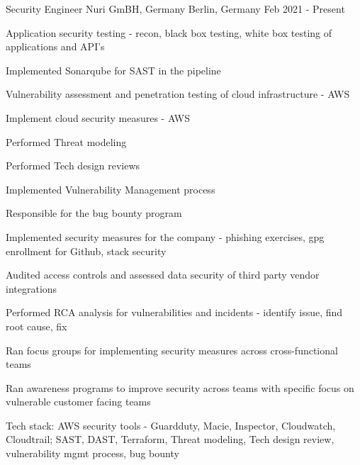 
\begin{cventries}

\cventry
    {Security Engineer} %
    {Nuri GmBH, Germany} %
    {Berlin, Germany} %
    {Feb 2021 - Present} %
    {
      \begin{cvitems} %
        \item {Application security testing - recon, black box testing, white box testing of applications and API's}
        \item {Implemented Sonarqube for SAST in the pipeline}
        \item {Vulnerability assessment and penetration testing of cloud infrastructure - AWS}
        \item {Implement cloud security measures - AWS}
        \item {Performed Threat modeling}
        \item {Performed Tech design reviews}
        \item {Implemented Vulnerability Management process}
        \item {Responsible for the bug bounty program}
        \item {Implemented security measures for the company - phishing exercises, gpg enrollment for Github, stack security}
        \item {Audited access controls and assessed data security of third party vendor integrations}
        \item {Performed RCA analysis for vulnerabilities and incidents - identify issue, find root cause, fix}
        \item {Ran focus groups for implementing security measures across cross-functional teams}
        \item {Ran awareness programs to improve security across teams with specific focus on vulnerable customer facing teams}
        \item {Tech stack: AWS security tools - Guardduty, Macie, Inspector, Cloudwatch, Cloudtrail; SAST, DAST, Terraform, Threat modeling, Tech design review, vulnerability mgmt process, bug bounty}
      \end{cvitems}
    }


\end{cventries}
